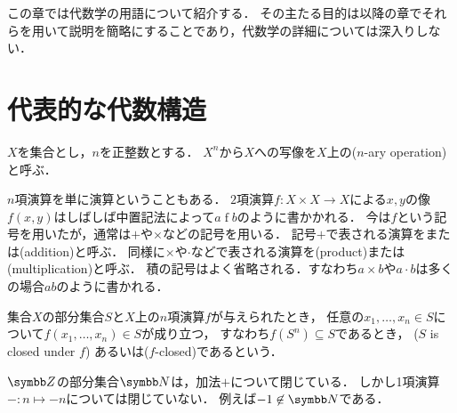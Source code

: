 \documentclass{ltjsbook}
\begin{document}

この章では代数学の用語について紹介する．
その主たる目的は以降の章でそれらを用いて説明を簡略にすることであり，代数学の詳細については深入りしない．

\section{代表的な代数構造}

\begin{thmbox}
\begin{definition}
\(X\)を集合とし，\(n\)を正整数とする．
\(X^n\)から\(X\)への写像を\(X\)上の(\(n\)-ary operation)と呼ぶ{\footnotemark}．
\end{definition}
\end{thmbox}


\(n\)項演算を単に演算ということもある．
\(2\)項演算\(f \colon X \times X \to X\)による\(x, y\)の像\(f(x, y)\)はしばしば中置記法によって\(a \mathbin{f} b\)のように書かかれる．
今は\(f\)という記号を用いたが，通常は\(\mathord{+}\)や\(\mathord{\times}\)などの記号を用いる．
記号\(\mathord{+}\)で表される演算をまたは(addition)と呼ぶ．
同様に\(\mathord{\times}\)や\(\mathord{\cdot}\)などで表される演算を(product)または(multiplication)と呼ぶ．
積の記号はよく省略される．すなわち\(a \times b\)や\(a \cdot b\)は多くの場合\(ab\)のように書かれる．

集合\(X\)の部分集合\(S\)と\(X\)上の\(n\)項演算\(f\)が与えられたとき，
任意の\(x_1, \ldots, x_n \in S\)について\(f(x_1, \ldots, x_n) \in S\)が成り立つ，
すなわち\(f(S^n) \subseteq S\)であるとき，
(\(S\) is closed under \(f\))
あるいは(\(f\)-closed)であるという．

\begin{example} \(\Integer\)の部分集合\(\NaturalNumber\)は，加法\(\mathord{+}\)について閉じている．
しかし1項演算\(\mathord{-}\colon n \mapsto -n\)については閉じていない．
例えば\(-1 \not\in \NaturalNumber\)である．
\end{example}
\end{document}
